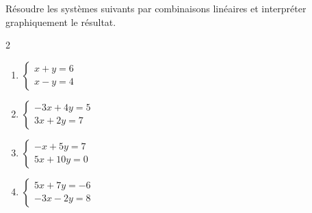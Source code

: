 \begin{exo}{}
	Résoudre les systèmes suivants par combinaisons linéaires et interpréter graphiquement le résultat.
	\vspace*{-2mm}
	\begin{multicols}{2}
	\begin{enumerate}
		\item $\begin{cases} x + y = 6 \\ x - y = 4 \end{cases}$
		\item $\begin{cases} -3x + 4y = 5 \\ 3x + 2y = 7 \end{cases}$
		\item $\begin{cases} -x + 5y = 7 \\ 5x + 10y = 0 \end{cases}$
		\item $\begin{cases} 5x + 7y = -6 \\ -3x - 2y = 8 \end{cases}$
	\end{enumerate}
	\end{multicols}
\end{exo}
